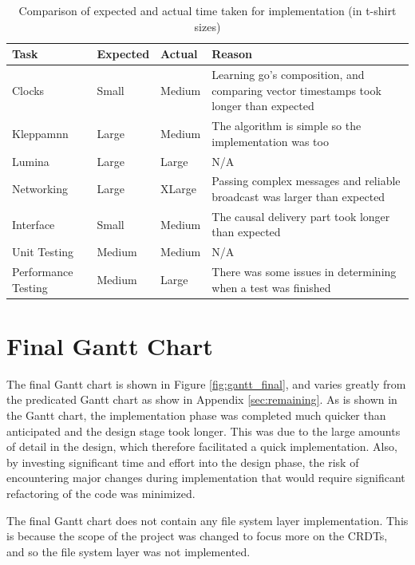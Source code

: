 \documentclass[12pt]{report}
\begin{document}
\begin{table}[h]
    \centering
    \begin{tabularx}{1\textwidth}{|p{2.2cm}|l|l|X|}
        \hline
        \textbf{Task} & \textbf{Expected} & \textbf{Actual} & \textbf{Reason} \\ \hline
        Clocks & Small &  Medium  & Learning go's composition, and comparing vector timestamps took longer than expected \\ \hline
        Kleppamnn & Large &  Medium & The algorithm is simple so the implementation was too \\ \hline
        Lumina & Large &  Large  &  N/A \\ \hline
        Networking & Large &  XLarge &  Passing complex messages and reliable broadcast was larger than expected \\ \hline
        Interface & Small &  Medium  & The causal delivery part took longer than expected \\ \hline
        Unit Testing & Medium &  Medium  & N/A \\ \hline
        Performance Testing & Medium &  Large  & There was some issues in determining when a test was finished \\ \hline
    \end{tabularx}
    \caption{Comparison of expected and actual time taken for implementation (in t-shirt sizes)}
\label{tab:implementation_table}
\end{table}

\section{Final Gantt Chart}
The final Gantt chart is shown in Figure \ref{fig:gantt_final}, and varies greatly from the predicated Gantt chart as show in Appendix \ref{sec:remaining}. As is shown in the Gantt chart, the implementation phase was completed much quicker than anticipated and the design stage took longer. This was due to the large amounts of detail in the design, which therefore facilitated a quick implementation. Also, by investing significant time and effort into the design phase, the risk of encountering major changes during implementation that would require significant refactoring of the code was minimized. \par

The final Gantt chart does not contain any file system layer implementation. This is because the scope of the project was changed to focus more on the CRDTs, and so the file system layer was not implemented. \par
\end{document}
